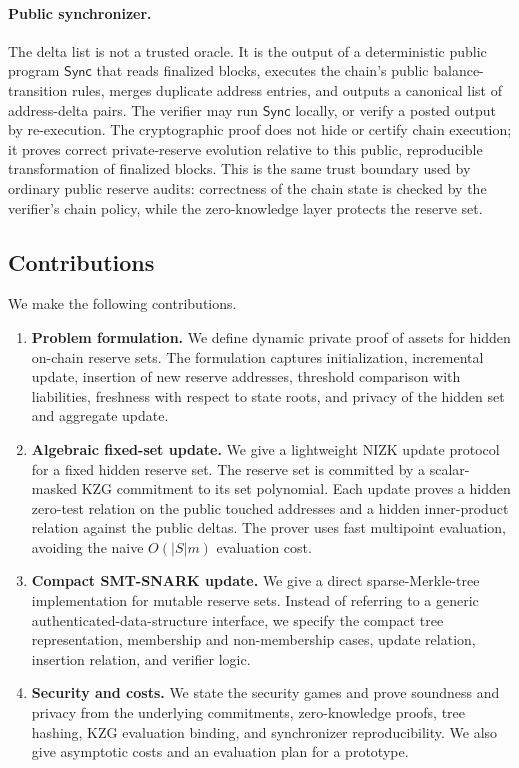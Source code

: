 \documentclass[runningheads]{llncs}
\newcommand{\Sync}{\mathsf{Sync}}
\begin{document}
\paragraph{Public synchronizer.}
The delta list is not a trusted oracle.  It is the output of a deterministic public program \(\Sync\) that reads finalized blocks, executes the chain's public balance-transition rules, merges duplicate address entries, and outputs a canonical list of address-delta pairs.  The verifier may run \(\Sync\) locally, or verify a posted output by re-execution.  The cryptographic proof does not hide or certify chain execution; it proves correct private-reserve evolution relative to this public, reproducible transformation of finalized blocks.  This is the same trust boundary used by ordinary public reserve audits: correctness of the chain state is checked by the verifier's chain policy, while the zero-knowledge layer protects the reserve set.

\subsection{Contributions}

We make the following contributions.

\begin{enumerate}[leftmargin=2em]
    \item \textbf{Problem formulation.} We define dynamic private proof of assets for hidden on-chain reserve sets.  The formulation captures initialization, incremental update, insertion of new reserve addresses, threshold comparison with liabilities, freshness with respect to state roots, and privacy of the hidden set and aggregate update.
    \item \textbf{Algebraic fixed-set update.} We give a lightweight NIZK update protocol for a fixed hidden reserve set.  The reserve set is committed by a scalar-masked KZG commitment to its set polynomial.  Each update proves a hidden zero-test relation on the public touched addresses and a hidden inner-product relation against the public deltas.  The prover uses fast multipoint evaluation, avoiding the naive \(O(|S|m)\) evaluation cost.
    \item \textbf{Compact SMT-SNARK update.} We give a direct sparse-Merkle-tree implementation for mutable reserve sets.  Instead of referring to a generic authenticated-data-structure interface, we specify the compact tree representation, membership and non-membership cases, update relation, insertion relation, and verifier logic.
    \item \textbf{Security and costs.} We state the security games and prove soundness and privacy from the underlying commitments, zero-knowledge proofs, tree hashing, KZG evaluation binding, and synchronizer reproducibility.  We also give asymptotic costs and an evaluation plan for a prototype.
\end{enumerate}
\end{document}
